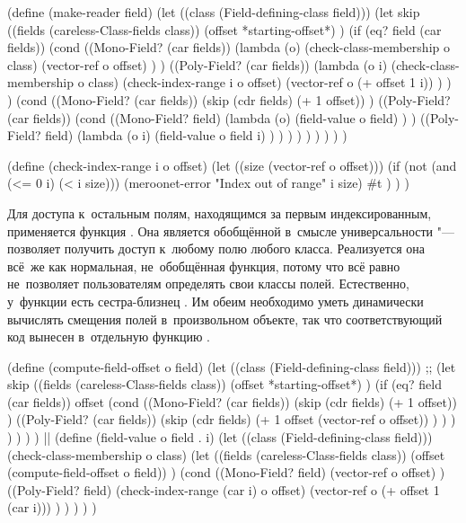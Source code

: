 \begin{code:lisp}
(define (make-reader field)
  (let ((class (Field-defining-class field)))
    (let skip ((fields (careless-Class-fields class))
               (offset *starting-offset*) )
      (if (eq? field (car fields))
          (cond ((Mono-Field? (car fields))
                 (lambda (o)
                   (check-class-membership o class)
                   (vector-ref o offset) ) )
                ((Poly-Field? (car fields))
                 (lambda (o i)
                   (check-class-membership o class)
                   (check-index-range i o offset)
                   (vector-ref o (+ offset 1 i)) ) ) )
          (cond ((Mono-Field? (car fields))
                 (skip (cdr fields) (+ 1 offset)) )
                ((Poly-Field? (car fields))
                 (cond ((Mono-Field? field)
                        (lambda (o)
                          (field-value o field) ) )
                       ((Poly-Field? field)
                        (lambda (o i)
                          (field-value o field i) ) ) ) ) ) ) ) ) )

(define (check-index-range i o offset)
  (let ((size (vector-ref o offset)))
    (if (not (and (<= 0 i) (< i size)))
        (meroonet-error "Index out of range" i size)
        #t ) ) )
\end{code:lisp}

Для доступа к~остальным полям, находящимся за первым индексированным,
применяется функция . Она является обобщённой в~смысле
универсальности "--- позволяет получить доступ к~любому полю любого класса.
Реализуется она всё~же как нормальная, не~обобщённая функция, потому что
{\Meroonet} всё равно не~позволяет пользователям определять свои классы
полей. Естественно, у~функции  есть сестра-близнец
. Им обеим необходимо уметь динамически вычислять
смещения полей в~произвольном объекте, так что соответствующий код вынесен
в~отдельную функцию .

\begin{code:lisp}
(define (compute-field-offset o field)
  (let ((class (Field-defining-class field)))
    ;; 
    (let skip ((fields (careless-Class-fields class))
               (offset *starting-offset*) )
      (if (eq? field (car fields)) offset
          (cond ((Mono-Field? (car fields))
                 (skip (cdr fields) (+ 1 offset)) )
                ((Poly-Field? (car fields))
                 (skip (cdr fields)
                       (+ 1 offset (vector-ref o offset)) ) ) ) ) ) ) )
||
(define (field-value o field . i)
  (let ((class (Field-defining-class field)))
    (check-class-membership o class)
    (let ((fields (careless-Class-fields class))
          (offset (compute-field-offset o field)) )
      (cond ((Mono-Field? field)
             (vector-ref o offset) )
            ((Poly-Field? field)
             (check-index-range (car i) o offset)
             (vector-ref o (+ offset 1 (car i))) ) ) ) ) )
\end{code:lisp}


